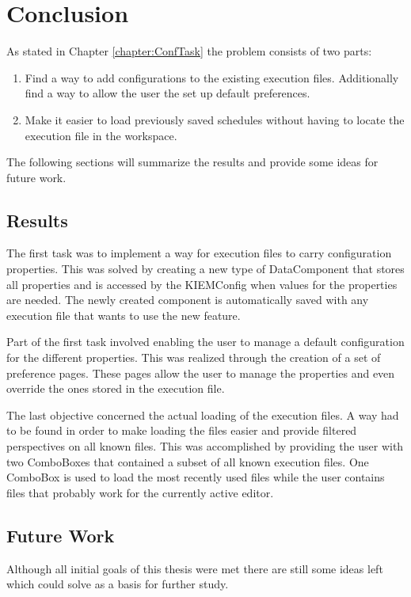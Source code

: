 \chapter{Conclusion}
\label{chapter:ConfConclusion}
As stated in Chapter \ref{chapter:ConfTask} the problem consists of two parts:
\begin{enumerate}
 \item Find a way to add configurations to the existing execution files. Additionally find
a way to allow the user the set up default preferences.
 \item Make it easier to load previously saved schedules without having to locate
the execution file in the workspace.
\end{enumerate}
The following sections will summarize the results and provide some ideas for
future work.

\section{Results}
The first task was to implement a way for execution files to carry configuration
properties. This was solved by creating a new type of DataComponent that stores all
properties and is accessed by the \ac{KIEMConfig} when values for the properties are needed.
The newly created component is automatically saved with any execution file that wants to
use the new feature.

Part of the first task involved enabling the user to manage a default configuration
for the different properties. This was realized through the creation of a set
of preference pages. These pages allow the user to manage the properties and even
override the ones stored in the execution file.

The last objective concerned the actual loading of the execution files. A way had to be
found in order to make loading the files easier and provide filtered perspectives on all known
files. This was accomplished by providing the user with two ComboBoxes that contained a
subset of all known execution files. One ComboBox is used to load the most recently used files
while the user contains files that probably work for the currently active editor.

\section{Future Work}
Although all initial goals of this thesis were met there are still some ideas left which
could solve as a basis for further study.
